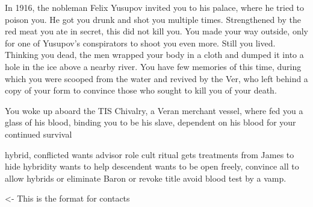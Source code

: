 \documentclass[char]{guildcamp4}
\begin{document}
In 1916, the nobleman Felix Yusupov invited you to his palace, where he tried to poison you. He got you drunk and shot you multiple times. Strengthened by the red meat you ate in secret, this did not kill you. You made your way outside, only for one of Yusupov's conspirators to shoot you even more. Still you lived. Thinking you dead, the men wrapped your body in a cloth and dumped it into a hole in the ice above a nearby river. You have few memories of this time, during which you were scooped from the water and revived by the Ver, who left behind a copy of your form to convince those who sought to kill you of your death.

You woke up aboard the TIS Chivalry, a Veran merchant vessel, where \cVone{} fed you a glass of his blood, binding you to be his slave, dependent on his blood for your continued survival

hybrid, conflicted
wants advisor role
cult ritual
gets treatments from James to hide hybridity
wants to help descendent
wants to be open freely, convince all to allow hybrids or eliminate Baron or revoke title
avoid blood test by a vamp.

\begin{itemz}[Goals]
	\item 
\end{itemz}

\begin{itemz}[Notes]
	\item 
\end{itemz}

\begin{contacts}
	\contact{\cTest{}} <- This is the format for contacts 
\end{contacts}
\end{document}
